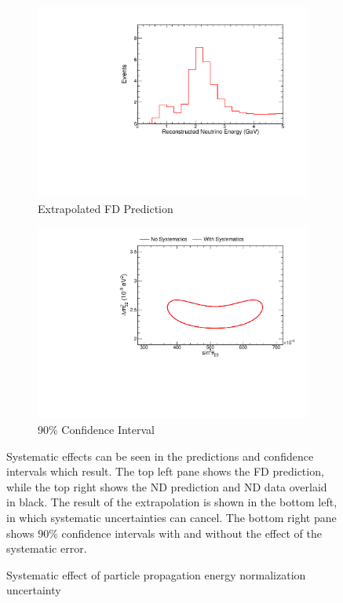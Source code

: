 {\begin{figure}
\begin{center}
\begin{subfigure}[c]{0.49\textwidth}
\includegraphics[width=\textwidth]{figures/systs/prediction/fd_extrap_prediction_geantNorm.pdf}
\caption*{Extrapolated FD Prediction}
\end{subfigure}
\begin{subfigure}[c]{0.49\textwidth}
\includegraphics[width=\textwidth]{figures/systs/prediction/fd_extrap_contour_geantNorm.pdf}
\caption*{90\% Confidence Interval}
\end{subfigure}
\end{center}
\caption{Systematic effect of  particle propagation energy normalization uncertainty}{
Systematic effects can be seen in the predictions and confidence intervals
which result.
The top left pane shows the FD prediction, while the top right shows the
ND prediction and ND data overlaid in black.
The result of the extrapolation is shown in the bottom left, in which
systematic uncertainties can cancel.
The bottom right pane shows 90\% confidence intervals with and without
the effect of the systematic error.}
\label{syst_fig_geantNorm}


\end{figure}}
